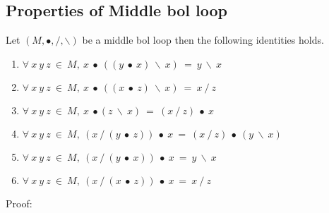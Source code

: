 \subsection{Properties of Middle bol loop}
Let $(M, ∙, /, \backslash)$ be a middle bol loop then the following
identities holds.
\begin{enumerate}
\item \(\forall\ x\ y\ z\ \in\ M,\ x\ ∙\ ((y\ ∙\ x)\ \backslash \ x)\ =\ y\ \backslash\ x\) 
\item \(\forall\ x\ y\ z\ \in\ M,\ x\ ∙\ ((x\ ∙\ z)\ \backslash \ x)\ =\ x\ /\ z\)
\item \(\forall\ x\ y\ z\ \in\ M,\ x\ ∙ (z\ \backslash\ x)\ =\ (x\ /\ z)\ ∙\ x\)
\item \(\forall\ x\ y\ z\ \in\ M,\ (x\ /\ (y\ ∙\ z))\ ∙\ x\ =\ (x\ /\ z)\ ∙\ (y\ \backslash\ x)\)
\item \(\forall\ x\ y\ z\ \in\ M,\ (x\ /\ (y\ ∙\ x))\ ∙\ x\ =\ y\ \backslash \ x\)
\item \(\forall\ x\ y\ z\ \in\ M,\ (x\ /\ (x\ ∙\ z))\ ∙\ x\ = \ x\ /\  z\)
\end{enumerate}
Proof:
